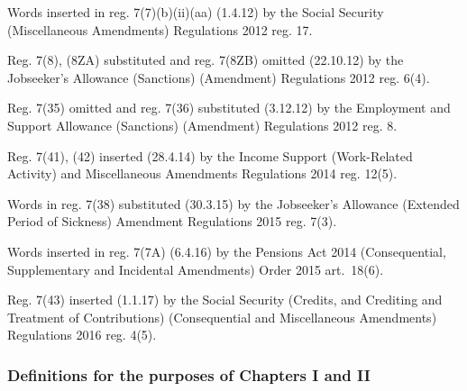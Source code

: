 \documentclass[12pt,a4paper]{article}
\begin{document}
{Words inserted in reg. 7(7)(b)(ii)(aa) (1.4.12) by the Social Security (Miscellaneous Amendments) Regulations 2012 reg. 17.

Reg. 7(8), (8ZA) substituted and reg. 7(8ZB) omitted (22.10.12) by the Jobseeker’s Allowance (Sanctions) (Amendment) Regulations 2012 reg. 6(4).

Reg. 7(35) omitted and reg. 7(36) substituted (3.12.12) by the Employment and Support Allowance (Sanctions) (Amendment) Regulations 2012 reg. 8.

Reg. 7(41), (42) inserted (28.4.14) by the Income Support (Work-Related Activity) and Miscellaneous Amendments Regulations 2014 reg. 12(5).

Words in reg. 7(38) substituted (30.3.15) by the Jobseeker’s Allowance (Extended Period of Sickness) Amendment Regulations 2015 reg. 7(3).

Words inserted in reg. 7(7A) (6.4.16) by the Pensions Act 2014 (Consequential, Supplementary and Incidental Amendments) Order 2015 art.~18(6).

Reg. 7(43) inserted (1.1.17) by the Social Security (Credits, and Crediting and Treatment of Contributions) (Consequential and Miscellaneous Amendments) Regulations 2016 reg. 4(5).
}


\subsubsection[7A. Definitions for the purposes of Chapters I and II]{Definitions for the purposes of Chapters I and II}
\end{document}
